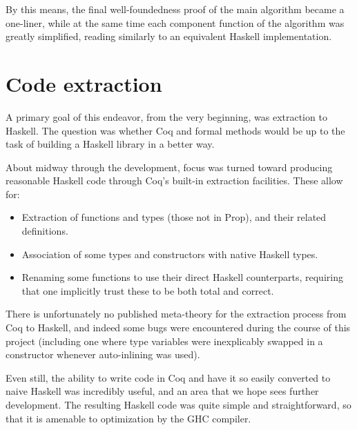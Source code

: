 \documentclass{llncs}
\begin{document}
By this means, the final well-foundedness proof of the main algorithm became a
one-liner, while at the same time each component function of the algorithm was
greatly simplified, reading similarly to an equivalent Haskell implementation.

\section{Code extraction}
\label{sec:extract}

A primary goal of this endeavor, from the very beginning, was extraction to
Haskell.  The question was whether Coq and formal methods would be up to the
task of building a Haskell library in a better way.

About midway through the development, focus was turned toward producing
reasonable Haskell code through Coq's built-in extraction facilities.  These
allow for:

\begin{itemize}
\item Extraction of functions and types (those not in Prop), and their related
  definitions.

\item Association of some types and constructors with native Haskell types.

\item Renaming some functions to use their direct Haskell counterparts,
  requiring that one implicitly trust these to be both total and correct.
\end{itemize}

There is unfortunately no published meta-theory for the extraction
process from Coq to Haskell, and indeed some bugs were encountered
during the course of this project (including one where type variables
were inexplicably swapped in a constructor whenever auto-inlining was
used).

Even still, the ability to write code in Coq and have it so easily converted
to naive Haskell was incredibly useful, and an area that we hope sees further
development.  The resulting Haskell code was quite simple and straightforward,
so that it is amenable to optimization by the GHC compiler.



\end{document}
